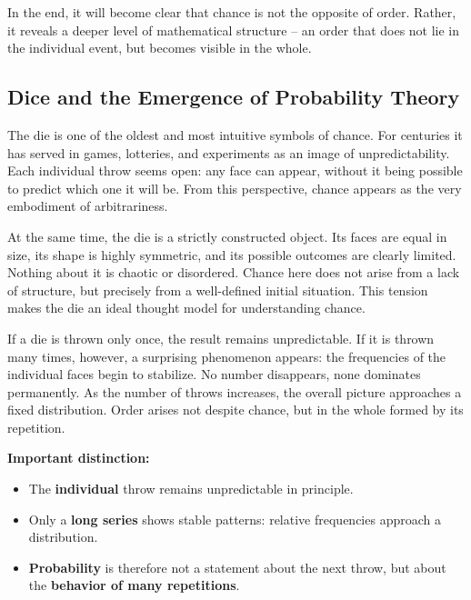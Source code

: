 In the end, it will become clear
that chance is not the opposite of order.
Rather, it reveals a deeper level of mathematical structure --
an order
that does not lie in the individual event,
but becomes visible in the whole.


\subsection{Dice and the Emergence of Probability Theory}

The die is one of the oldest and most intuitive symbols of chance.
For centuries it has served in games, lotteries, and experiments
as an image of unpredictability.
Each individual throw seems open:
any face can appear,
without it being possible to predict
which one it will be.
From this perspective, chance appears
as the very embodiment of arbitrariness.

At the same time, the die is a strictly constructed object.
Its faces are equal in size,
its shape is highly symmetric,
and its possible outcomes are clearly limited.
Nothing about it is chaotic or disordered.
Chance here does not arise from a lack of structure,
but precisely from a well-defined initial situation.
This tension makes the die
an ideal thought model for understanding chance.

If a die is thrown only once,
the result remains unpredictable.
If it is thrown many times, however,
a surprising phenomenon appears:
the frequencies of the individual faces begin to stabilize.
No number disappears,
none dominates permanently.
As the number of throws increases,
the overall picture approaches a fixed distribution.
Order arises not despite chance,
but in the whole formed by its repetition.

\begin{DidacticBox}
	\label{box:singlethrow}
	\small
	\textbf{Important distinction:}
	\begin{itemize}
		\item The \textbf{individual} throw remains unpredictable in principle.
		\item Only a \textbf{long series} shows stable patterns: relative frequencies approach a distribution.
		\item \textbf{Probability} is therefore not a statement about the next throw, but about the \textbf{behavior of many repetitions}.
	\end{itemize}
\end{DidacticBox}

